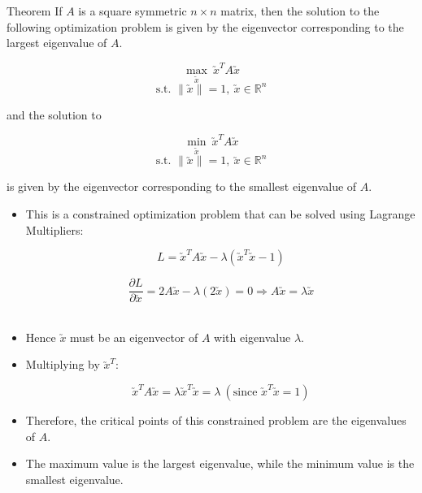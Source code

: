 \documentclass[10pt, aspectratio=169]{beamer}
\begin{document}
\begin{frame}
	\begin{block}{Theorem}
	If $A$ is a square symmetric $n \times n$ matrix, then the solution to the following optimization problem is given by the eigenvector corresponding to the largest eigenvalue of $A$.

\[
\max_{\utilde{x}} \ \utilde{x}^T A \utilde{x} 
\]
\[
\text{s.t. } \|\utilde{x}\| = 1, \ \utilde{x} \in \mathbb{R}^n
\]

and the solution to

\[
\min_{\utilde{x}} \ \utilde{x}^T A \utilde{x} 
\]
\[
\text{s.t. } \|\utilde{x}\| = 1, \ \utilde{x} \in \mathbb{R}^n
\]

is given by the eigenvector corresponding to the smallest eigenvalue of $A$.
	\end{block}

\end{frame}


\begin{frame}
\begin{itemize}
\item<1-> This is a constrained optimization problem that can be solved using Lagrange Multipliers:

\[
L = \utilde{x}^T A \utilde{x} - \lambda (\utilde{x}^T \utilde{x} - 1)
\]

\[
\frac{\partial L}{\partial \utilde{x}} = 2 A \utilde{x} - \lambda (2\utilde{x}) = 0 \Rightarrow A \utilde{x} = \lambda \utilde{x}
\]\\[1em]

\item<2-> Hence $\utilde{x}$ must be an eigenvector of $A$ with eigenvalue $\lambda$. \\[1em]

\item<3-> Multiplying by $\utilde{x}^T$:

\[
\utilde{x}^T A \utilde{x} = \lambda \utilde{x}^T \utilde{x} = \lambda \ (\text{since } \utilde{x}^T \utilde{x} = 1)
\]

\item<4-> Therefore, the critical points of this constrained problem are the eigenvalues of $A$. \\[0.5em]

\item<5-> The maximum value is the largest eigenvalue, while the minimum value is the smallest eigenvalue.
\end{itemize}
\end{frame}
\end{document}

